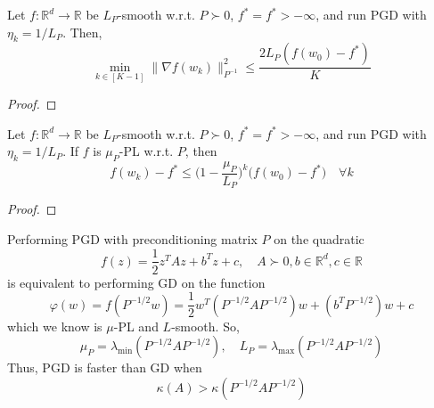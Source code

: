 	\begin{theorem}
	  \label{thm:convergence-to-criticality-of-pgd}
		Let $f: \mathbb{R}^d \to \mathbb{R}$ be $L_P$-smooth w.r.t. $P \succ 0$, $f^\ast = f^\ast > -\infty$, and run PGD with $\eta_k = 1/L_P$. Then, 
		\begin{equation}
			\min_{k \in [K-1]} \| \nabla f(w_k)\|_{P^{-1}}^2 \leq \frac{2 L_P (f(w_0) - f^\ast)}{K}
		\end{equation}
	\end{theorem}
	\begin{proof}
	  
	\end{proof}

	\begin{theorem}
	  \label{thm:linear-convergence-of-objective-value-on-pgd}
		Let $f: \mathbb{R}^d \to \mathbb{R}$ be $L_P$-smooth w.r.t. $P \succ 0$, $f^\ast = f^\ast > -\infty$, and run PGD with $\eta_k = 1/L_P$. If $f$ is $\mu_P$-PL w.r.t. $P$, then 
		\begin{equation}
			f(w_k) - f^\ast \leq \bigg( 1 - \frac{\mu_P}{L_P} \bigg)^k \big( f(w_0) - f^\ast \big) \quad \forall k
		\end{equation}
	\end{theorem}
	\begin{proof}
	  
	\end{proof}

	\begin{example}[Quadratic]
	  \label{ex:quadratic}
	  Performing PGD with preconditioning matrix $P$ on the quadratic
		\begin{equation}
			f(z) = \frac{1}{2} z^T A z + b^T z + c, \quad A \succ 0, b \in \mathbb{R}^d, c \in \mathbb{R}
		\end{equation}
		is equivalent to performing GD on the function 
		\begin{equation}
			\varphi(w) = f(P^{-1/2} w) = \frac{1}{2} w^T (P^{-1/2} A P^{-1/2}) w + (b^T P^{-1/2}) w + c
		\end{equation}
		which we know is $\mu$-PL and $L$-smooth. So, 
		\begin{equation}
			\mu_P = \lambda_{\min}(P^{-1/2} A P^{-1/2}), \quad L_P = \lambda_{\max} (P^{-1/2} A P^{-1/2})
		\end{equation}
		Thus, PGD is faster than GD when 
		\begin{equation}
		  \kappa(A) > \kappa (P^{-1/2} A P^{-1/2})
		\end{equation}
	\end{example}

